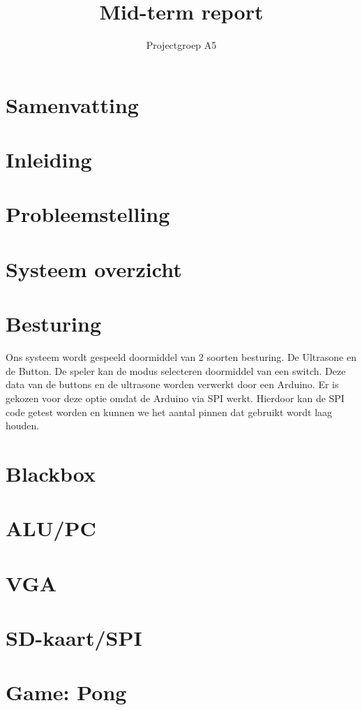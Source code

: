 \documentclass[oneside,dutch]{tudelft-report}
\begin{document}
\frontmatter

\title{Mid-term report}
\author{Projectgroep A5}
\maketitle
\chapter{Samenvatting}


\chapter{Inleiding}
\newpage

\chapter{Probleemstelling}
\newpage

\chapter{Systeem overzicht}
\newpage

\chapter{Besturing}
Ons systeem wordt gespeeld doormiddel van 2 soorten besturing. De Ultrasone en de Button. De speler kan de modus selecteren doormiddel van een switch. Deze data van de buttons en de ultrasone worden verwerkt door een Arduino. Er is gekozen voor deze optie omdat de Arduino via SPI werkt. Hierdoor kan de SPI code getest worden en kunnen we het aantal pinnen dat gebruikt wordt laag houden. 
\newpage
\chapter{Blackbox}
\newpage

\chapter{ALU/PC}
\newpage

\chapter{VGA}
\newpage

\chapter{SD-kaart/SPI}
\newpage

\chapter{Game: Pong}
\end{document}
